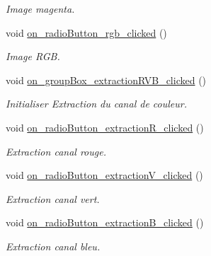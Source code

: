 \begin{DoxyCompactItemize}
\begin{DoxyCompactList}\small\item\em Image magenta. \end{DoxyCompactList}\item 
\mbox{\label{classMainWindow_a029c841c8d1452bab969569f3001840a}} 
void \hyperlink{classMainWindow_a029c841c8d1452bab969569f3001840a}{on\+\_\+radio\+Button\+\_\+rgb\+\_\+clicked} ()
\begin{DoxyCompactList}\small\item\em Image R\+GB. \end{DoxyCompactList}\item 
\mbox{\label{classMainWindow_a643b2edab2f78bab60c3e3dd5993409e}} 
void \hyperlink{classMainWindow_a643b2edab2f78bab60c3e3dd5993409e}{on\+\_\+group\+Box\+\_\+extraction\+R\+V\+B\+\_\+clicked} ()
\begin{DoxyCompactList}\small\item\em Initialiser Extraction du canal de couleur. \end{DoxyCompactList}\item 
\mbox{\label{classMainWindow_a70993f7b7d5f3cbd67979813234da83a}} 
void \hyperlink{classMainWindow_a70993f7b7d5f3cbd67979813234da83a}{on\+\_\+radio\+Button\+\_\+extraction\+R\+\_\+clicked} ()
\begin{DoxyCompactList}\small\item\em Extraction canal rouge. \end{DoxyCompactList}\item 
\mbox{\label{classMainWindow_a73f419590c6daf7f3a40fe480c22779a}} 
void \hyperlink{classMainWindow_a73f419590c6daf7f3a40fe480c22779a}{on\+\_\+radio\+Button\+\_\+extraction\+V\+\_\+clicked} ()
\begin{DoxyCompactList}\small\item\em Extraction canal vert. \end{DoxyCompactList}\item 
\mbox{\label{classMainWindow_a1632f39c370309f84beef1262e176cc0}} 
void \hyperlink{classMainWindow_a1632f39c370309f84beef1262e176cc0}{on\+\_\+radio\+Button\+\_\+extraction\+B\+\_\+clicked} ()
\begin{DoxyCompactList}\small\item\em Extraction canal bleu. \end{DoxyCompactList}\item 

\end{DoxyCompactItemize}
